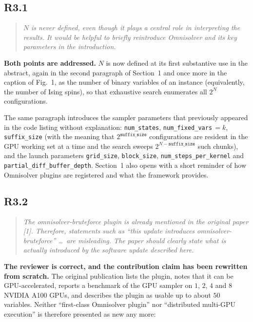 \documentclass[11pt,a4paper]{article}
\newenvironment{reviewercomment}
  {\begin{quote}\itshape\small}
  {\end{quote}}
\newcommand{\point}[2]{%
  \subsection*{#1}%
  \begin{reviewercomment}#2\end{reviewercomment}}
\begin{document}
\point{R3.1}{$N$ is never defined, even though it plays a central role in interpreting the
results. It would be helpful to briefly reintroduce Omnisolver and its key parameters in the
introduction.}

\textbf{Both points are addressed.} $N$ is now defined at its first substantive use in the
abstract, again in the second paragraph of Section~1 and once more in the caption of Fig.~1,
as the number of binary variables of an instance (equivalently, the number of Ising spins), so
that exhaustive search enumerates all $2^{N}$ configurations.

The same paragraph introduces the sampler parameters that previously appeared in the code
listing without explanation: \texttt{num\_states}, \texttt{num\_fixed\_vars}$\,=k$,
\texttt{suffix\_size} (with the meaning that $2^{\texttt{suffix\_size}}$ configurations are
resident in the GPU working set at a time and the search sweeps
$2^{N-\texttt{suffix\_size}}$ such chunks), and the launch parameters \texttt{grid\_size},
\texttt{block\_size}, \texttt{num\_steps\_per\_kernel} and
\texttt{partial\_diff\_buffer\_depth}. Section~1 also opens with a short reminder of how
Omnisolver plugins are registered and what the framework provides.

\point{R3.2}{The omnisolver-bruteforce plugin is already mentioned in the original paper [1].
Therefore, statements such as ``this update introduces omnisolver-bruteforce'' \dots\ are
misleading. The paper should clearly state what is actually introduced by the software update
described here.}

\textbf{The reviewer is correct, and the contribution claim has been rewritten from scratch.}
The original publication lists the plugin, notes that it can be GPU-accelerated, reports a
benchmark of the GPU sampler on $1$, $2$, $4$ and $8$ NVIDIA A100 GPUs, and describes the
plugin as usable up to about $50$ variables. Neither ``first-class Omnisolver
plugin'' nor ``distributed multi-GPU execution'' is therefore presented as new any more:
\end{document}
